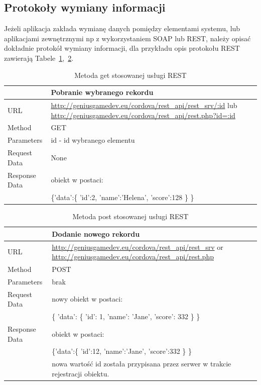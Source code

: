 \documentclass[12pt,a4paper]{article}
\begin{document}
\subsection{Protokoły wymiany informacji}
Jeżeli aplikacja zakłada wymianę danych pomiędzy elementami systemu, lub aplikacjami zewnętrznymi np z wykorzystaniem SOAP lub REST, należy opisać dokładnie protokół wymiany informacji, dla przykładu opis protokołu REST zawierają Tabele~\ref{rest1},~\ref{rest2}.

\begin{table}[th]
\begin{tabularx}{\textwidth}{|l|X|}
\hline
&\textbf{Pobranie wybranego rekordu}\\\hline
URL &   \url{http://geniusgamedev.eu/cordova/rest_api/rest_srv/:id} lub \url{http://geniusgamedev.eu/cordova/rest_api/rest.php?id=:id}\\\hline
Method  & GET\\\hline
Parameters  & id - id wybranego elementu \\\hline
Request Data & None\\\hline
Response Data & obiekt w postaci:\\
&

\{'data':\{
    'id':2,
    'name':'Helena',
    'score':128
    \}
\}

\\\hline
\end{tabularx}
\caption{Metoda get stosowanej usługi REST}\label{rest1}
\end{table}

\begin{table}
\begin{tabularx}{\textwidth}{|l|X|}
\hline
&\textbf{Dodanie nowego rekordu}\\\hline
URL &   \url{http://geniusgamedev.eu/cordova/rest_api/rest_srv} or \url{http://geniusgamedev.eu/cordova/rest_api/rest.php}\\\hline
Method  & POST\\\hline
Parameters  & brak \\\hline
Request Data & nowy obiekt w postaci:\\
&\{
'data': \{
'id': 1,
'name': 'Jane',
'score': 332
\}
\}
\\\hline
Response Data & obiekt w postaci:\\
&
\{'data':\{
    'id':12,
    'name':'Jane',
    'score':332
    \}
\}
\\
&nowa wartość id została przypisana przez serwer w trakcie rejestracji obiektu.
\\\hline
\end{tabularx}
\caption{Metoda post stosowanej usługi REST}\label{rest2}
\end{table}
\end{document}
